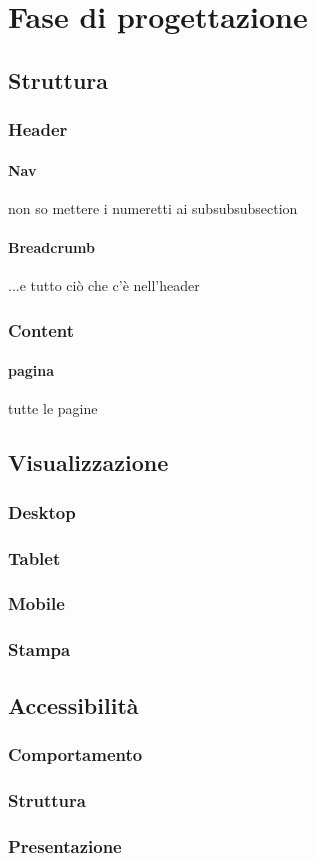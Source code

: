 
\section{Fase di progettazione}
\subsection{Struttura}
\subsubsection{Header}
\paragraph{Nav} 
non so mettere i numeretti ai subsubsubsection
\paragraph{Breadcrumb}
...e tutto ciò che c'è nell'header
\subsubsection{Content}
\paragraph{pagina}
tutte le pagine
\subsection{Visualizzazione}
\subsubsection{Desktop}
\subsubsection{Tablet}
\subsubsection{Mobile}
\subsubsection{Stampa}
\subsection{Accessibilità}
\subsubsection{Comportamento}
\subsubsection{Struttura}
\subsubsection{Presentazione}

\newpage